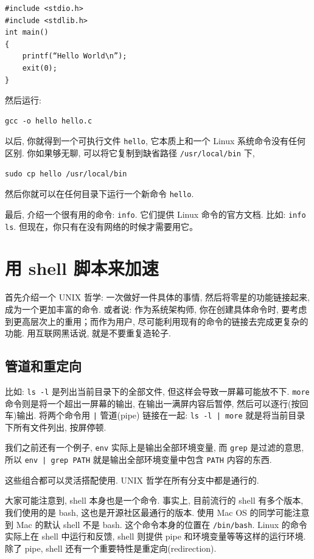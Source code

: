 \documentclass[a4paper]{ctexart}
\begin{document}
\begin{verbatim}
#include <stdio.h>
#include <stdlib.h>
int main()
{
    printf(“Hello World\n”);
    exit(0);
}
\end{verbatim}

然后运行:

\begin{verbatim}
gcc -o hello hello.c
\end{verbatim}

以后, 你就得到一个可执行文件 \verb|hello|, 它本质上和一个 Linux 系统命令没有任何区别. 
你如果够无聊, 可以将它复制到缺省路径 \verb|/usr/local/bin| 下,  

\begin{verbatim}
sudo cp hello /usr/local/bin
\end{verbatim}

然后你就可以在任何目录下运行一个新命令 \verb|hello|. 

最后, 介绍一个很有用的命令: \verb|info|. 它们提供 Linux 命令的官方文档. 比如:
\verb|info ls|. 但现在，你只有在没有网络的时候才需要用它。

\section{用 shell 脚本来加速}

首先介绍一个 UNIX 哲学: 一次做好一件具体的事情, 然后将零星的功能链接起来, 成为一个更加丰富的命令.
或者说: 作为系统架构师, 你在创建具体命令时, 要考虑到更高层次上的重用；而作为用户,
尽可能利用现有的命令的链接去完成更复杂的功能. 用互联网黑话说, 就是不要重复造轮子.

\subsection{管道和重定向}
比如: \verb|ls -l| 是列出当前目录下的全部文件, 但这样会导致一屏幕可能放不下.
\verb|more| 命令则是将一个超出一屏幕的输出, 在输出一满屏内容后暂停, 然后可以逐行(按回车)输出.
将两个命令用 \verb!|! 管道(pipe) 链接在一起: \verb!ls -l | more! 就是将当前目录下所有文件列出,
按屏停顿.

我们之前还有一个例子, \verb|env| 实际上是输出全部环境变量, 而 \verb|grep| 是过滤的意思,
所以 \verb!env | grep PATH! 就是输出全部环境变量中包含 \verb|PATH| 内容的东西.

这些组合都可以灵活搭配使用. UNIX 哲学在所有分支中都是通行的. 

大家可能注意到, shell 本身也是一个命令. 事实上, 目前流行的 shell 有多个版本, 我们使用的是 bash,
这也是开源社区最通行的版本. 使用 Mac OS 的同学可能注意到 Mac 的默认 shell 不是 bash.
这个命令本身的位置在 \verb|/bin/bash|. Linux 的命令实际上在 shell 中运行和反馈, shell 则提供 pipe
和环境变量等等这样的运行环境. 除了 pipe, shell 还有一个重要特性是重定向(redirection).
\end{document}
